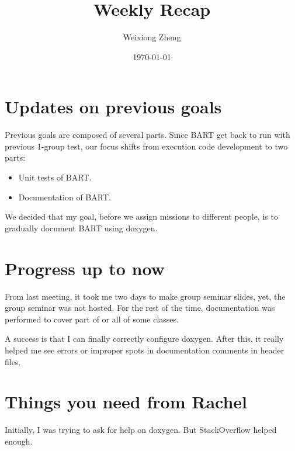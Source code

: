 \documentclass{article}
\title{Weekly Recap} %
\author{Weixiong Zheng} %
\date{\today} %
\begin{document}
\maketitle %

\section{Updates on previous goals}
Previous goals are composed of several parts. Since BART get back to run with previous 1-group test, our focus shifts from execution code development to two parts:
\begin{itemize}
	\item Unit tests of BART.
	\item Documentation of BART.
\end{itemize}

We decided that my goal, before we assign missions to different people, is to gradually document BART using doxygen.

\section{Progress up to now}
From last meeting, it took me two days to make group seminar slides, yet, the group seminar was not hosted. For the rest of the time, documentation was performed to cover part of or all of some classes.

A success is that I can finally correctly configure doxygen. After this, it really helped me see errors or improper spots in documentation comments in header files.

\section{Things you need from Rachel}
Initially, I was trying to ask for help on doxygen. But StackOverflow helped enough.
\end{document}
